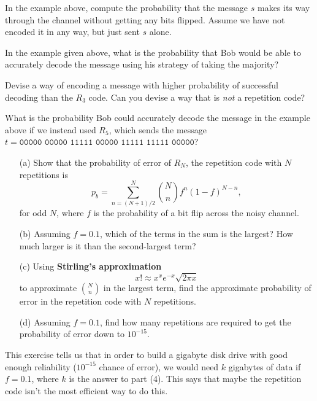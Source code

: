 \documentclass{article}
\begin{document}
\begin{exercise}
    In the example above, compute the probability that the message \(s\) makes its way through the channel without getting any bits flipped. Assume we have not encoded it in any way, but just sent \(s\) alone.
\end{exercise}

\begin{exercise}
    In the example given above, what is the probability that Bob would be able to accurately decode the message using his strategy of taking the majority?
\end{exercise}

\begin{exercise}
    Devise a way of encoding a message with higher probability of successful decoding than the \(R_3\) code.
    Can you devise a way that is \textit{not} a repetition code?
\end{exercise}

\begin{exercise}
    What is the probability Bob could accurately decode the message in the example above if we instead used \(R_5\), which sends the message \(t = \texttt{00000 00000 11111 00000 11111 11111 00000}\)?
\end{exercise}

\begin{exercise}
    \begin{enumerate}
        \item[(a)] Show that the probability of error of \(R_N\), the repetition code with \(N\) repetitions is 
        \[p_b = \sum_{n=(N+1)/2}^N\binom{N}{n}f^n(1-f)^{N-n},\]
        for odd \(N\), where \(f\) is the probability of a bit flip across the noisy channel.
        \item[(b)] Assuming \(f=0.1\), which of the terms in the sum is the largest?
        How much larger is it than the second-largest term?
        \item[(c)] Using \textbf{Stirling's approximation}
        \[x! \approx x^xe^{-x}\sqrt{2\pi x}\]
        to approximate \(\binom{N}{n}\) in the largest term, find the approximate probability of error in the repetition code with \(N\) repetitions.
        \item[(d)] Assuming \(f=0.1\), find how many repetitions are required to get the probability of error down to \(10^{-15}\).
    \end{enumerate}
    This exercise tells us that in order to build a gigabyte disk drive with good enough reliability (\(10^{-15}\) chance of error), we would need \(k\) gigabytes of data if \(f=0.1\), where \(k\) is the answer to part (4). 
    This says that maybe the repetition code isn't the most efficient way to do this.
\end{exercise}
\end{document}
